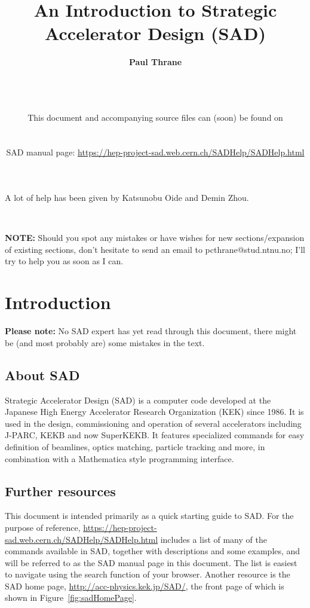 \documentclass{article}
\title{\huge{An Introduction to Strategic Accelerator Design (SAD)}}
\author{\textbf{Paul Thrane}}
\date{
	\sadDate \\ \ \\ \ \\
	This document and accompanying source files can (soon) be found on\\
	\sourceLocation\\ \ \\
	SAD manual page: \url{https://hep-project-sad.web.cern.ch/SADHelp/SADHelp.html}
	}
\begin{document}
\maketitle
A lot of help has been given by Katsunobu Oide and Demin Zhou.

\
\

\textbf{NOTE:} Should you spot any mistakes or have wishes for new sections/expansion of existing sections, don't hesitate to send an email to pcthrane@stud.ntnu.no; I'll try to help you as soon as I can.



\newpage
\tableofcontents
\newpage


\section{Introduction}
%
\textbf{Please note:} No SAD expert has yet read through this document, there might be (and most probably are) some mistakes in the text.

\subsection{About SAD}
Strategic Accelerator Design (SAD) is a computer code developed at the Japanese High Energy Accelerator Research Organization (KEK) since 1986. It is used in the design, commissioning and operation of several accelerators including J-PARC, KEKB and now SuperKEKB. It features specialized commands for easy definition of beamlines, optics matching, particle tracking and more, in combination with a Mathematica style programming interface.

\subsection{Further resources}
This document is intended primarily as a quick starting guide to SAD. 
For the purpose of reference, 
\url{https://hep-project-sad.web.cern.ch/SADHelp/SADHelp.html} 
includes a list of many of the commands available in SAD, together with descriptions and some examples, and will be referred to as the SAD manual page in this document. The list is easiest to navigate using the search function of your browser. Another resource is the SAD home page, \url{http://acc-physics.kek.jp/SAD/}, the front page of which is shown in Figure~\ref{fig:sadHomePage}.
\end{document}
